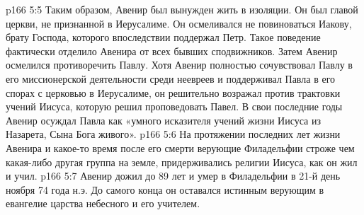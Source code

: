 \vs p166 5:5 Таким образом, Авенир был вынужден жить в изоляции. Он был главой церкви, не признанной в Иерусалиме. Он осмеливался не повиноваться Иакову, брату Господа, которого впоследствии поддержал Петр. Такое поведение фактически отделило Авенира от всех бывших сподвижников. Затем Авенир осмелился противоречить Павлу. Хотя Авенир полностью сочувствовал Павлу в его миссионерской деятельности среди неевреев и поддерживал Павла в его спорах с церковью в Иерусалиме, он решительно возражал против трактовки учений Иисуса, которую решил проповедовать Павел. В свои последние годы Авенир осуждал Павла как «умного исказителя учений жизни Иисуса из Назарета, Сына Бога живого».
\vs p166 5:6 На протяжении последних лет жизни Авенира и какое\hyp{}то время после его смерти верующие Филадельфии строже чем какая\hyp{}либо другая группа на земле, придерживались религии Иисуса, как он жил и учил.
\vs p166 5:7 Авенир дожил до 89 лет и умер в Филадельфии в 21\hyp{}й день ноября 74 года н.э. До самого конца он оставался истинным верующим в евангелие царства небесного и его учителем.

